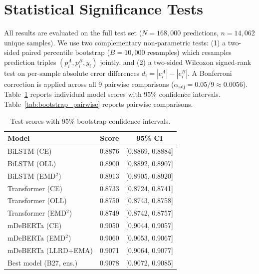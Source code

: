 \documentclass{article}
\begin{document}
\FloatBarrier
\section{Statistical Significance Tests}
\label{app:bootstrap}

All results are evaluated on the full test set ($N{=}168{,}000$ predictions, $n{=}14{,}062$ unique samples).
We use two complementary non-parametric tests: (1) a two-sided paired percentile bootstrap ($B{=}10{,}000$ resamples) which resamples prediction triples $(p^A_i, p^B_i, y_i)$ jointly, and (2) a two-sided Wilcoxon signed-rank test on per-sample absolute error differences $d_i = |e^A_i| - |e^B_i|$.
A Bonferroni correction is applied across all 9 pairwise comparisons ($\alpha_\text{adj} = 0.05/9 \approx 0.0056$).
Table~\ref{tab:bootstrap_ci} reports individual model scores with 95\% confidence intervals.
Table~\ref{tab:bootstrap_pairwise} reports pairwise comparisons.

\begin{table}[H]
\centering
\small
\begin{tabular}{lcc}
\toprule
\textbf{Model} & \textbf{Score} & \textbf{95\% CI} \\
\midrule
BiLSTM (CE)                  & 0.8876 & [0.8869, 0.8884] \\
BiLSTM (OLL)                 & 0.8900 & [0.8892, 0.8907] \\
BiLSTM (EMD$^2$)             & 0.8913 & [0.8905, 0.8920] \\
Transformer (CE)             & 0.8733 & [0.8724, 0.8741] \\
Transformer (OLL)            & 0.8750 & [0.8743, 0.8758] \\
Transformer (EMD$^2$)        & 0.8749 & [0.8742, 0.8757] \\
mDeBERTa (CE)                & 0.9050 & [0.9044, 0.9057] \\
mDeBERTa (EMD$^2$)           & 0.9060 & [0.9053, 0.9067] \\
mDeBERTa (LLRD+EMA)          & 0.9071 & [0.9064, 0.9077] \\
Best model (B27, ens.)       & 0.9078 & [0.9072, 0.9085] \\
\bottomrule
\end{tabular}
\caption{Test scores with 95\% bootstrap confidence intervals.}
\label{tab:bootstrap_ci}
\end{table}
\end{document}
